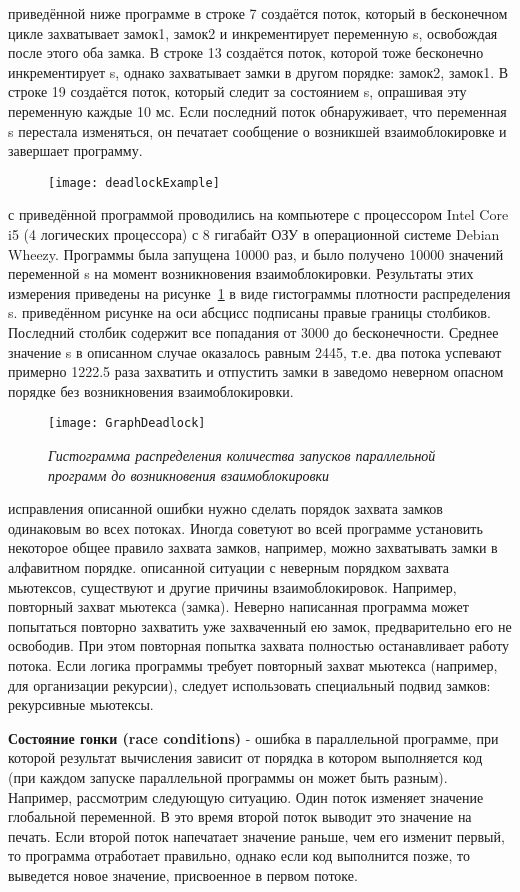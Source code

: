 {	 приведённой ниже программе в строке 7 создаётся поток, который в бесконечном цикле захватывает замок1, замок2 и инкрементирует переменную s, освобождая после этого оба замка. В строке 13 создаётся поток, которой тоже бесконечно инкрементирует s, однако захватывает замки в другом порядке: замок2, замок1. В строке 19 создаётся поток, который следит за состоянием s, опрашивая эту переменную каждые 10 мс. Если последний поток обнаруживает, что переменная s перестала изменяться, он печатает сообщение о возникшей взаимоблокировке и завершает программу.  
	\begin{figure}[H]
		\texttt{[image: deadlockExample]}
	\end{figure}
	 с приведённой программой проводились на компьютере с процессором Intel Core i5 (4 логических процессора) с 8 гигабайт ОЗУ в операционной системе Debian Wheezy. Программы была запущена 10000 раз, и было получено 10000 значений переменной s на момент возникновения взаимоблокировки. Результаты этих измерения приведены на рисунке~\ref{GraphDeadlock:image} в виде гистограммы плотности распределения s.
	 приведённом рисунке на оси абсцисс подписаны правые границы столбиков. Последний столбик содержит все попадания от 3000 до бесконечности. Среднее значение s в описанном случае оказалось равным 2445, т.е. два потока успевают примерно 1222.5 раза захватить и отпустить замки в заведомо неверном опасном порядке без возникновения взаимоблокировки.
	\begin{figure}[H]
		\texttt{[image: GraphDeadlock]}
		\caption{\textit{Гистограмма распределения количества запусков параллельной программ до возникновения взаимоблокировки}}
		\label{GraphDeadlock:image}
	\end{figure}
	 исправления описанной ошибки нужно сделать порядок захвата замков одинаковым во всех потоках. Иногда советуют во всей программе установить некоторое общее правило захвата замков, например, можно захватывать замки в алфавитном порядке.
	 описанной ситуации с неверным порядком захвата мьютексов, существуют и другие причины взаимоблокировок. Например, повторный захват мьютекса (замка). Неверно написанная программа может попытаться повторно захватить уже захваченный ею замок, предварительно его не освободив. При этом повторная попытка захвата полностью останавливает работу потока. Если логика программы требует повторный захват мьютекса (например, для организации рекурсии), следует использовать специальный подвид замков: рекурсивные мьютексы.
	\par\textbf{Состояние гонки (race conditions)} - ошибка в параллельной программе, при которой результат вычисления зависит от порядка в котором выполняется код (при каждом запуске параллельной программы он может быть разным). Например, рассмотрим следующую ситуацию. Один поток изменяет значение глобальной переменной. В это время второй поток выводит это значение на печать. Если второй поток напечатает значение раньше, чем его изменит первый, то программа отработает правильно, однако если код выполнится позже, то выведется новое значение, присвоенное в первом потоке.
}
